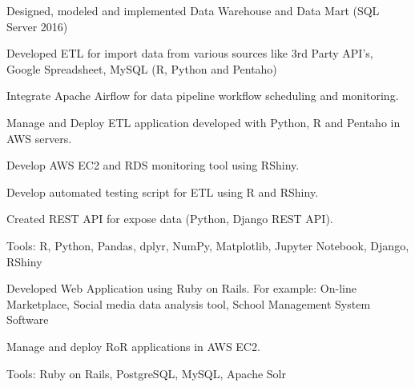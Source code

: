 \documentclass[letterpaper]{deedy-resume} %
\begin{document}
\begin{minipage}[t]{0.66\textwidth}
\begin{tightitemize}
\end{tightitemize}



\begin{tightitemize}
\item Designed, modeled and implemented Data Warehouse and Data Mart (SQL
Server 2016)
\item Developed ETL for import data from various sources like 3rd Party API’s,
Google Spreadsheet, MySQL (R, Python and Pentaho)
\item Integrate Apache Airflow for data pipeline workflow scheduling and monitoring.
\item Manage and Deploy ETL application developed with Python, R and Pentaho in
AWS servers.
\item Develop AWS EC2 and RDS monitoring tool using RShiny.
\item Develop automated testing script for ETL using R and RShiny.
\item Created REST API for expose data (Python, Django REST API).
\item Tools: R, Python, Pandas, dplyr, NumPy, Matplotlib, Jupyter Notebook, Django,
RShiny
\end{tightitemize}

\sectionspace %



\begin{tightitemize}
\item Developed Web Application using Ruby on Rails. For example: On-line
Marketplace, Social media data analysis tool, School Management System
Software
\item Manage and deploy RoR applications in AWS EC2.
\item Tools: Ruby on Rails, PostgreSQL, MySQL, Apache Solr
\end{tightitemize}

\sectionspace %

\end{minipage} %
\end{document}
